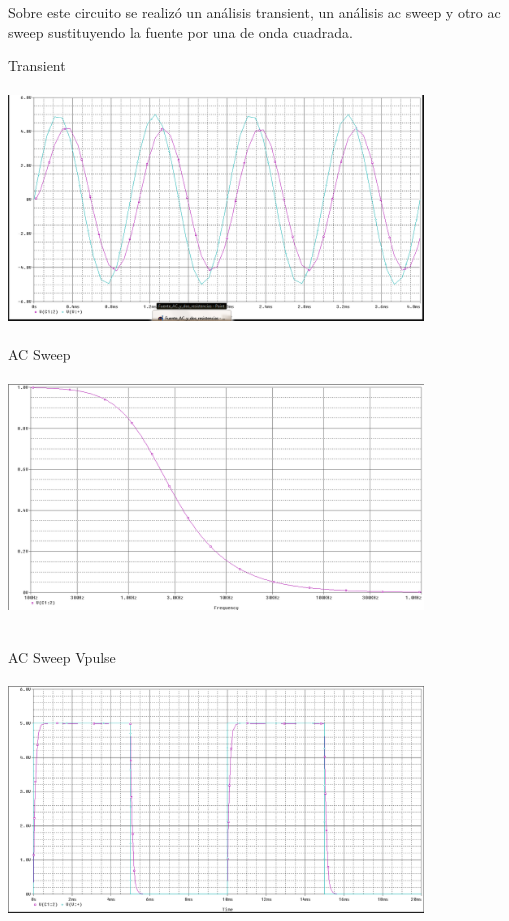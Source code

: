 \documentclass[12pt]{article}
\begin{document}
\begin{itemize}
		\noindent Sobre este circuito se realizó un análisis transient, un análisis ac sweep y otro ac sweep sustituyendo la fuente por una de onda cuadrada.
		
		\noindent Transient\\
		
		\includegraphics[width=11cm,height=7cm]{Img/Fuente_AC_RC.png}\\
		
		\noindent AC Sweep\\
		
		\includegraphics[width=11cm,height=7cm]{Img/Fuente_AC_RC_AC_sweep.png}\\
		
		\newpage 
		
		\noindent AC Sweep Vpulse\\
		
		\includegraphics[width=11cm,height=7cm]{Img/Fuente_AC_RC_Vpulse}\\
		

\end{itemize}
\end{document}
